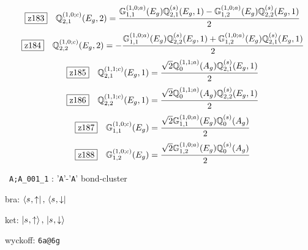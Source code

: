 \documentclass[fleqn,10pt,landscape]{jsarticle}
\begin{document}
\begin{dmath*}
\hspace*{3mm}\fbox{z183}\quad \mathbb{Q}_{2,1}^{(1,0;c)}(E_{g},2)=\frac{\mathbb{G}_{1,1}^{(1,0;a)}(E_{g}) \mathbb{Q}_{2,1}^{(s)}(E_{g},1) - \mathbb{G}_{1,2}^{(1,0;a)}(E_{g}) \mathbb{Q}_{2,2}^{(s)}(E_{g},1)}{2}
\end{dmath*}
\begin{dmath*}
\hspace*{3mm}\fbox{z184}\quad \mathbb{Q}_{2,2}^{(1,0;c)}(E_{g},2)=- \frac{\mathbb{G}_{1,1}^{(1,0;a)}(E_{g}) \mathbb{Q}_{2,2}^{(s)}(E_{g},1) + \mathbb{G}_{1,2}^{(1,0;a)}(E_{g}) \mathbb{Q}_{2,1}^{(s)}(E_{g},1)}{2}
\end{dmath*}
\begin{dmath*}
\hspace*{3mm}\fbox{z185}\quad \mathbb{Q}_{2,1}^{(1,1;c)}(E_{g},1)=\frac{\sqrt{2} \mathbb{Q}_{0}^{(1,1;a)}(A_{g}) \mathbb{Q}_{2,1}^{(s)}(E_{g},1)}{2}
\end{dmath*}
\begin{dmath*}
\hspace*{3mm}\fbox{z186}\quad \mathbb{Q}_{2,2}^{(1,1;c)}(E_{g},1)=\frac{\sqrt{2} \mathbb{Q}_{0}^{(1,1;a)}(A_{g}) \mathbb{Q}_{2,2}^{(s)}(E_{g},1)}{2}
\end{dmath*}
\begin{dmath*}
\hspace*{3mm}\fbox{z187}\quad \mathbb{G}_{1,1}^{(1,0;c)}(E_{g})=\frac{\sqrt{2} \mathbb{G}_{1,1}^{(1,0;a)}(E_{g}) \mathbb{Q}_{0}^{(s)}(A_{g})}{2}
\end{dmath*}
\begin{dmath*}
\hspace*{3mm}\fbox{z188}\quad \mathbb{G}_{1,2}^{(1,0;c)}(E_{g})=\frac{\sqrt{2} \mathbb{G}_{1,2}^{(1,0;a)}(E_{g}) \mathbb{Q}_{0}^{(s)}(A_{g})}{2}
\end{dmath*}
\vspace{5mm}

\noindent\textbullet\, \texttt{A;A_001_1} : '\texttt{A}'-'\texttt{A}' bond-cluster

\noindent\quad * bra: $\bra{s_{},\uparrow},\, \bra{s_{},\downarrow}$

\noindent\quad * ket: $\ket{s_{},\uparrow},\, \ket{s_{},\downarrow}$

\noindent\quad * wyckoff: \texttt{6a@6g}
\end{document}
